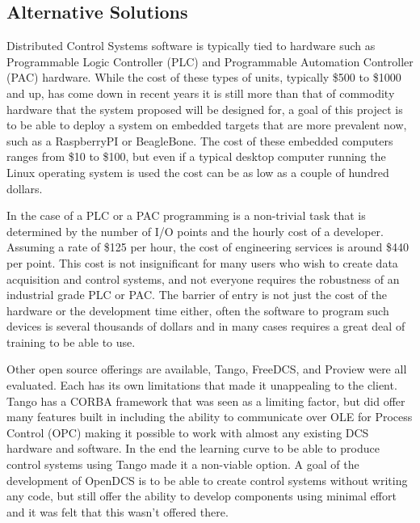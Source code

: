   \subsection{Alternative Solutions}\label{sec:desc-alt}

    Distributed Control Systems software is typically tied to hardware such as
    Programmable Logic Controller (PLC) and Programmable Automation Controller
    (PAC) hardware. While the cost of these types of units, typically \$500 to
    \$1000 and up, has come down in recent years it is still more than that of
    commodity hardware that the system proposed will be designed for, a goal of
    this project is to be able to deploy a system on embedded targets that are
    more prevalent now, such as a RaspberryPI or BeagleBone. The cost of these
    embedded computers ranges from \$10 to \$100, but even if a typical desktop
    computer running the Linux operating system is used the cost can be as low
    as a couple of hundred dollars.

    In the case of a PLC or a PAC programming is a non-trivial task that is
    determined by the number of I/O points and the hourly cost of a developer.
    Assuming a rate of \$125 per hour, the cost of engineering services is
    around \$440 per point\cite{Automation2014}. This cost is not insignificant
    for many users who wish to create data acquisition and control systems, and
    not everyone requires the robustness of an industrial grade PLC or PAC.
    The barrier of entry is not just the cost of the hardware or the
    development time either, often the software to program such devices is
    several thousands of dollars and in many cases requires a great deal of
    training to be able to use.

    Other open source offerings are available, Tango, FreeDCS, and Proview were
    all evaluated. Each has its own limitations that made it unappealing to the
    client. Tango has a CORBA framework that was seen as a limiting factor, but
    did offer many features built in including the ability to communicate over
    OLE for Process Control (OPC) making it possible to work with almost any
    existing DCS hardware and software. In the end the learning curve to be
    able to produce control systems using Tango made it a non-viable option. A
    goal of the development of OpenDCS is to be able to create control systems
    without writing any code, but still offer the ability to develop components
    using minimal effort and it was felt that this wasn't offered there.

